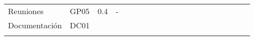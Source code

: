 \begin{longtable}[c]{llclllllllllllllllll}
        \multicolumn{1}{|l|}{Reuniones}                                                                                         & \multicolumn{1}{l|}{GP05}                                                      & \multicolumn{1}{l|}{0.4}                                                         & \multicolumn{1}{l|}{-}                                                               &                                 &                                 &                                 & \cellcolor[HTML]{EF8787}        &                                 &                                 &                                 &                                 &                                 &                                 &                                 &                                 &                                 & \cellcolor[HTML]{EF8787}        & \multicolumn{1}{l|}{}                         &  \\ \cline{1-4}
        \multicolumn{1}{|l|}{Documentación}                                                                                     & \multicolumn{1}{l|}{DC01}                                                      & \multicolumn{1}{l|}{}                                                            & \multicolumn{1}{l|}{}                                                                &                                 &                                 &                                 &                                 &                                 &                                 &                                 &                                 &                                 &                                 &                                 &                                 &                                 &                                 & \multicolumn{1}{l|}{}                         &  \\ \cline{1-19}
        \multicolumn{4}{|l|}{}                                                                                                                                                                                                                                                                                                                                                             & \multicolumn{15}{l|}{}                                                                                                                                                                                                                                                                                                                                                                                                                                                                                                                    &  \\ \cline{1-19}

\end{longtable}
